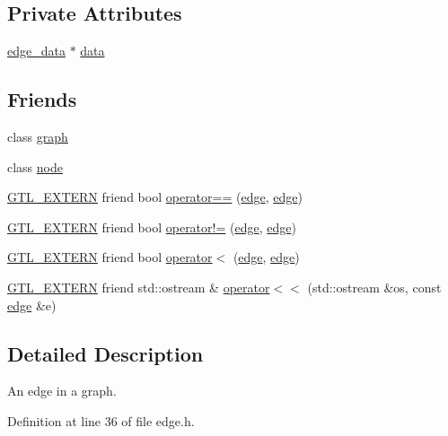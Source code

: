 \subsection*{Private Attributes}
\begin{DoxyCompactItemize}
\item 
\mbox{\hyperlink{classedge__data}{edge\+\_\+data}} $\ast$ \mbox{\hyperlink{classedge_a0ebb6dfa28b77f47529085049352b436}{data}}
\end{DoxyCompactItemize}
\subsection*{Friends}
\begin{DoxyCompactItemize}
\item 
class \mbox{\hyperlink{classedge_ab8b0dbc1b36724e5e4635ac651c218cb}{graph}}
\item 
class \mbox{\hyperlink{classedge_a3700a7180235e9a28534b15d5922de12}{node}}
\item 
\mbox{\hyperlink{_g_t_l_8h_a014cd1e9b3e67a78ae433eda95c8fd25}{G\+T\+L\+\_\+\+E\+X\+T\+E\+RN}} friend bool \mbox{\hyperlink{classedge_a78a6fd635e7d716ac256f4aac2ef5e4e}{operator==}} (\mbox{\hyperlink{classedge}{edge}}, \mbox{\hyperlink{classedge}{edge}})
\item 
\mbox{\hyperlink{_g_t_l_8h_a014cd1e9b3e67a78ae433eda95c8fd25}{G\+T\+L\+\_\+\+E\+X\+T\+E\+RN}} friend bool \mbox{\hyperlink{classedge_a28eea0e0fbb76b2fbdb0ac1ee87c517b}{operator!=}} (\mbox{\hyperlink{classedge}{edge}}, \mbox{\hyperlink{classedge}{edge}})
\item 
\mbox{\hyperlink{_g_t_l_8h_a014cd1e9b3e67a78ae433eda95c8fd25}{G\+T\+L\+\_\+\+E\+X\+T\+E\+RN}} friend bool \mbox{\hyperlink{classedge_a2649acdf3e222d1763892556d1807168}{operator$<$}} (\mbox{\hyperlink{classedge}{edge}}, \mbox{\hyperlink{classedge}{edge}})
\item 
\mbox{\hyperlink{_g_t_l_8h_a014cd1e9b3e67a78ae433eda95c8fd25}{G\+T\+L\+\_\+\+E\+X\+T\+E\+RN}} friend std\+::ostream \& \mbox{\hyperlink{classedge_a0a878a3109271a41da15ba1c926406d1}{operator$<$$<$}} (std\+::ostream \&os, const \mbox{\hyperlink{classedge}{edge}} \&e)
\end{DoxyCompactItemize}


\subsection{Detailed Description}
An edge in a graph. 

Definition at line 36 of file edge.\+h.



